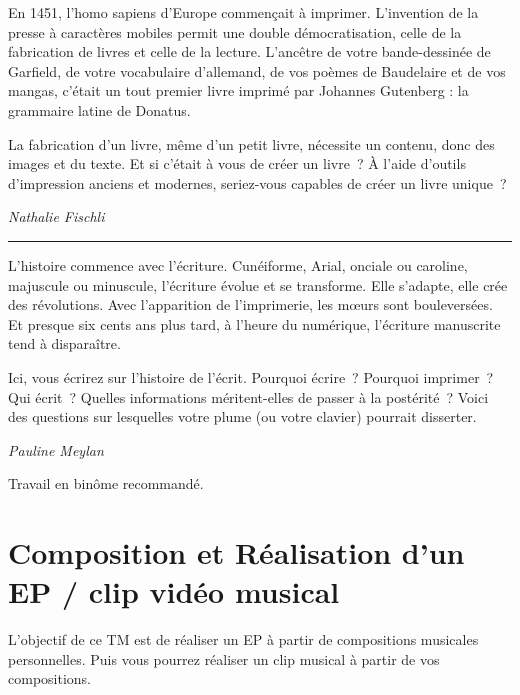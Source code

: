 \documentclass[
  10pt,
  french,
  a5paper,
  openany]{book}
\newenvironment{signature}{\begin{flushright}}{\end{flushright}}
\begin{document}
En 1451, l'homo sapiens d'Europe commençait à imprimer. L'invention de la presse à caractères mobiles permit une double démocratisation, celle de la fabrication de livres et celle de la lecture. L'ancêtre de votre bande-dessinée de Garfield, de votre vocabulaire d'allemand, de vos poèmes de Baudelaire et de vos mangas, c'était un tout premier livre imprimé par Johannes Gutenberg : la grammaire latine de Donatus.

La fabrication d'un livre, même d'un petit livre, nécessite un contenu, donc des images et du texte. Et si c'était à vous de créer un livre~? À l'aide d'outils d'impression anciens et modernes, seriez-vous capables de créer un livre unique~?

\begin{signature}
\emph{Nathalie Fischli}

\end{signature}

\begin{center}\rule{0.5\linewidth}{0.5pt}\end{center}

L'histoire commence avec l'écriture. Cunéiforme, Arial, onciale ou caroline, majuscule ou minuscule, l'écriture évolue et se transforme. Elle s'adapte, elle crée des révolutions. Avec l'apparition de l'imprimerie, les mœurs sont bouleversées. Et presque six cents ans plus tard, à l'heure du numérique, l'écriture manuscrite tend à disparaître.

Ici, vous écrirez sur l'histoire de l'écrit. Pourquoi écrire~? Pourquoi imprimer~? Qui écrit~? Quelles informations méritent-elles de passer à la postérité~? Voici des questions sur lesquelles votre plume (ou votre clavier) pourrait disserter.

\begin{signature}
\emph{Pauline Meylan}

\end{signature}

Travail en binôme recommandé.

\hypertarget{composition-et-ruxe9alisation-dun-ep-clip-viduxe9o-musical}{%
\chapter{Composition et Réalisation d'un EP / clip vidéo musical}\label{composition-et-ruxe9alisation-dun-ep-clip-viduxe9o-musical}}

L'objectif de ce TM est de réaliser un EP à partir de compositions musicales personnelles. Puis vous pourrez réaliser un clip musical à partir de vos compositions.
\end{document}
